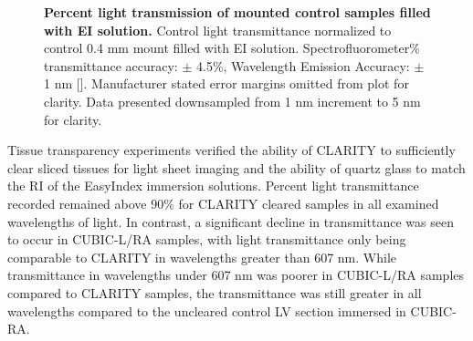 \begin{figure}[H]
    \centering
    \caption{\textbf{Percent light transmission of mounted control samples filled with EI solution.} Control light transmittance normalized to control 0.4 mm mount filled with EI solution. Spectrofluorometer\% transmittance accuracy: $\pm$ 4.5\%, Wavelength Emission Accuracy: $\pm$ 1 nm []. Manufacturer stated error margins omitted from plot for clarity. Data presented downsampled from 1 nm increment to 5 nm for clarity.}
    \label{fig:enter-label}
\end{figure}

Tissue transparency experiments verified the ability of CLARITY  to sufficiently clear sliced tissues for light sheet imaging and the ability of quartz glass to match the RI of the EasyIndex immersion solutions. Percent light transmittance recorded remained above 90\% for CLARITY cleared samples in all examined wavelengths of light. In contrast, a significant decline in transmittance was seen to occur in CUBIC-L/RA samples, with light transmittance only being comparable to CLARITY in wavelengths greater than 607 nm. While transmittance in wavelengths under 607 nm was poorer in CUBIC-L/RA samples compared to CLARITY samples, the transmittance was still greater in all wavelengths compared to the uncleared control LV section immersed in CUBIC-RA. 

